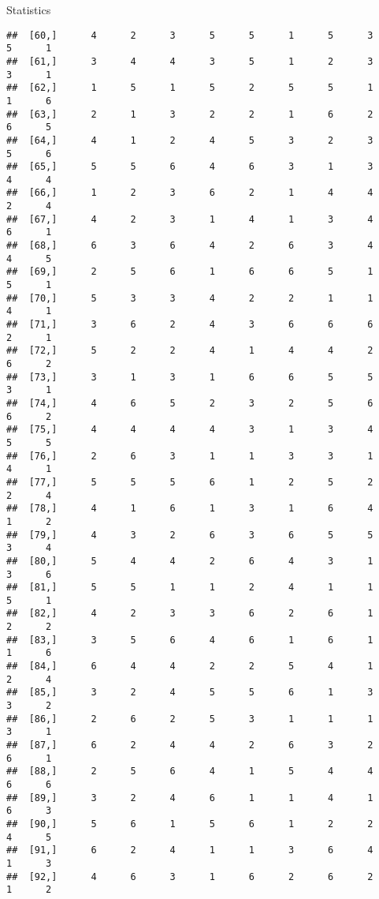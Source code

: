 \documentclass[
  ignorenonframetext,
]{beamer}
\begin{document}
\begin{frame}[fragile]{Statistics}
\begin{verbatim}
##  [60,]      4      2      3      5      5      1      5      3      5      1
##  [61,]      3      4      4      3      5      1      2      3      3      1
##  [62,]      1      5      1      5      2      5      5      1      1      6
##  [63,]      2      1      3      2      2      1      6      2      6      5
##  [64,]      4      1      2      4      5      3      2      3      5      6
##  [65,]      5      5      6      4      6      3      1      3      4      4
##  [66,]      1      2      3      6      2      1      4      4      2      4
##  [67,]      4      2      3      1      4      1      3      4      6      1
##  [68,]      6      3      6      4      2      6      3      4      4      5
##  [69,]      2      5      6      1      6      6      5      1      5      1
##  [70,]      5      3      3      4      2      2      1      1      4      1
##  [71,]      3      6      2      4      3      6      6      6      2      1
##  [72,]      5      2      2      4      1      4      4      2      6      2
##  [73,]      3      1      3      1      6      6      5      5      3      1
##  [74,]      4      6      5      2      3      2      5      6      6      2
##  [75,]      4      4      4      4      3      1      3      4      5      5
##  [76,]      2      6      3      1      1      3      3      1      4      1
##  [77,]      5      5      5      6      1      2      5      2      2      4
##  [78,]      4      1      6      1      3      1      6      4      1      2
##  [79,]      4      3      2      6      3      6      5      5      3      4
##  [80,]      5      4      4      2      6      4      3      1      3      6
##  [81,]      5      5      1      1      2      4      1      1      5      1
##  [82,]      4      2      3      3      6      2      6      1      2      2
##  [83,]      3      5      6      4      6      1      6      1      1      6
##  [84,]      6      4      4      2      2      5      4      1      2      4
##  [85,]      3      2      4      5      5      6      1      3      3      2
##  [86,]      2      6      2      5      3      1      1      1      3      1
##  [87,]      6      2      4      4      2      6      3      2      6      1
##  [88,]      2      5      6      4      1      5      4      4      6      6
##  [89,]      3      2      4      6      1      1      4      1      6      3
##  [90,]      5      6      1      5      6      1      2      2      4      5
##  [91,]      6      2      4      1      1      3      6      4      1      3
##  [92,]      4      6      3      1      6      2      6      2      1      2

\end{verbatim}
\end{frame}
\end{document}
